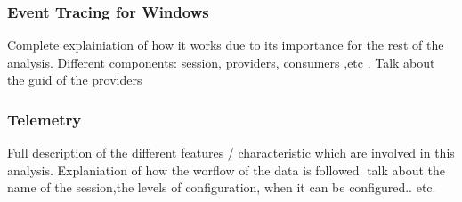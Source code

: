 \subsubsection{Event Tracing for Windows} \label{etw}
Complete explainiation of how it works due to its importance for the rest of the analysis. Different components: session, providers, consumers ,etc .
Talk about the guid of the providers
\subsubsection{Telemetry}
Full description of the different features / characteristic which are involved in this analysis. Explaniation of how the worflow of the data is followed.
talk about the name of the session,the levels of configuration, when it can be configured.. etc.

